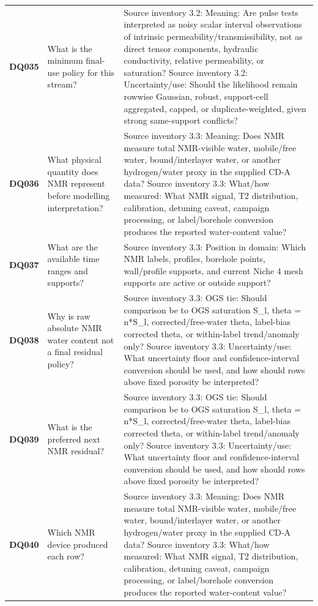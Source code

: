 \begin{longtable}{@{}L{0.09\textwidth} L{0.31\textwidth} L{0.52\textwidth}@{}}
\addlinespace[0.18em]
\textbf{DQ035} & What is the minimum final-use policy for this stream? & Source inventory 3.2: Meaning: Are pulse tests interpreted as noisy scalar interval observations of intrinsic permeability/transmissibility, not as direct tensor components, hydraulic conductivity, relative permeability, or saturation? Source inventory 3.2: Uncertainty/use: Should the likelihood remain rowwise Gaussian, robust, support-cell aggregated, capped, or duplicate-weighted, given strong same-support conflicts?\\
\addlinespace[0.18em]
\textbf{DQ036} & What physical quantity does NMR represent before modelling interpretation? & Source inventory 3.3: Meaning: Does NMR measure total NMR-visible water, mobile/free water, bound/interlayer water, or another hydrogen/water proxy in the supplied CD-A data? Source inventory 3.3: What/how measured: What NMR signal, T2 distribution, calibration, detuning caveat, campaign processing, or label/borehole conversion produces the reported water-content value?\\
\addlinespace[0.18em]
\textbf{DQ037} & What are the available time ranges and supports? & Source inventory 3.3: Position in domain: Which NMR labels, profiles, borehole points, wall/profile supports, and current Niche 4 mesh supports are active or outside support?\\
\addlinespace[0.18em]
\textbf{DQ038} & Why is raw absolute NMR water content not a final residual policy? & Source inventory 3.3: OGS tie: Should comparison be to OGS saturation S\_l, theta = n*S\_l, corrected/free-water theta, label-bias corrected theta, or within-label trend/anomaly only? Source inventory 3.3: Uncertainty/use: What uncertainty floor and confidence-interval conversion should be used, and how should rows above fixed porosity be interpreted?\\
\addlinespace[0.18em]
\textbf{DQ039} & What is the preferred next NMR residual? & Source inventory 3.3: OGS tie: Should comparison be to OGS saturation S\_l, theta = n*S\_l, corrected/free-water theta, label-bias corrected theta, or within-label trend/anomaly only? Source inventory 3.3: Uncertainty/use: What uncertainty floor and confidence-interval conversion should be used, and how should rows above fixed porosity be interpreted?\\
\addlinespace[0.18em]
\textbf{DQ040} & Which NMR device produced each row? & Source inventory 3.3: Meaning: Does NMR measure total NMR-visible water, mobile/free water, bound/interlayer water, or another hydrogen/water proxy in the supplied CD-A data? Source inventory 3.3: What/how measured: What NMR signal, T2 distribution, calibration, detuning caveat, campaign processing, or label/borehole conversion produces the reported water-content value?\\

\end{longtable}
